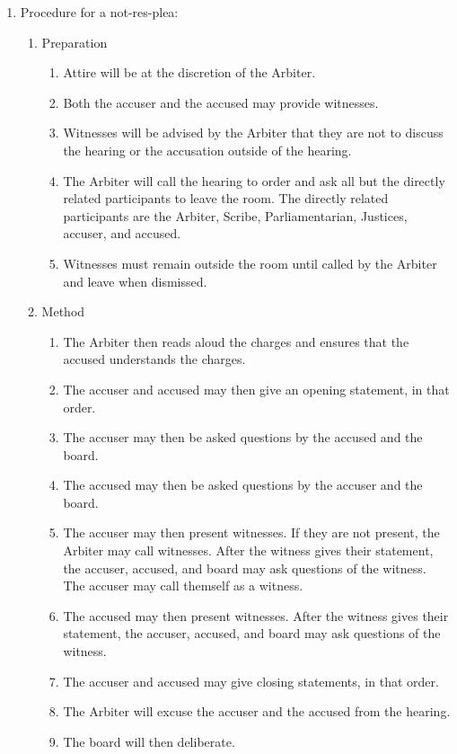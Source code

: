 \begin{enumerate}
		\item Procedure for a \gls{not-res-plea}:
			\begin{enumerate}
				\item Preparation
					\begin{enumerate}
						\item Attire will be at the discretion of the Arbiter.
						\item Both the accuser and the accused may provide witnesses.
						\item Witnesses will be advised by the Arbiter that they are not to discuss the hearing or the accusation outside of the hearing.
						\item The Arbiter will call the hearing to order and ask all but the directly related participants to leave the room. The directly related participants are the Arbiter, Scribe, Parliamentarian, Justices, accuser, and accused.
						\item Witnesses must remain outside the room until called by the Arbiter and leave when dismissed.
					\end{enumerate}
				\item Method
					\begin{enumerate}
						\item The Arbiter then reads aloud the charges and ensures that the accused understands the charges.
						\item The accuser and accused may then give an opening statement, in that order.
						\item The accuser may then be asked questions by the accused and the board.
						\item The accused may then be asked questions by the accuser and the board.
						\item The accuser may then present witnesses. If they are not present, the Arbiter may call witnesses. After the witness gives their statement, the accuser, accused, and board may ask questions of the witness. The accuser may call themself as a witness.
						\item The accused may then present witnesses. After the witness gives their statement, the accuser, accused, and board may ask questions of the witness.
						\item The accuser and accused may give closing statements, in that order.
						\item The Arbiter will excuse the accuser and the accused from the hearing.
						\item The board will then deliberate.
							\begin{enumerate}

\end{enumerate}
\end{enumerate}
\end{enumerate}
\end{enumerate}
